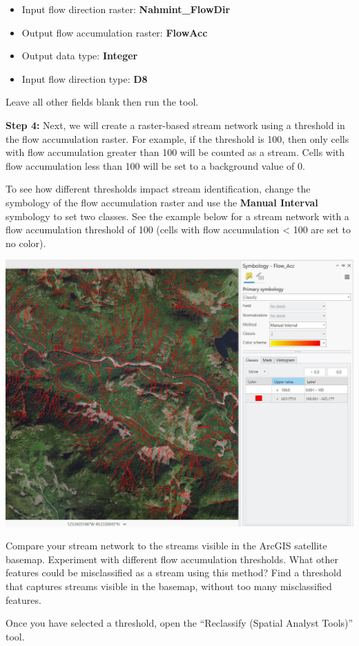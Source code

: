 \documentclass[
]{book}
\providecommand{\tightlist}{%
  \setlength{\itemsep}{0pt}\setlength{\parskip}{0pt}}
\begin{document}
\begin{itemize}
\tightlist
\item
  Input flow direction raster: \textbf{Nahmint\_FlowDir}
\item
  Output flow accumulation raster: \textbf{FlowAcc}
\item
  Output data type: \textbf{Integer}
\item
  Input flow direction type: \textbf{D8}
\end{itemize}

Leave all other fields blank then run the tool.

\textbf{Step 4:} Next, we will create a raster-based stream network using a threshold in the flow accumulation raster. For example, if the threshold is 100, then only cells with flow accumulation greater than 100 will be counted as a stream. Cells with flow accumulation less than 100 will be set to a background value of 0.

To see how different thresholds impact stream identification, change the symbology of the flow accumulation raster and use the \textbf{Manual Interval} symbology to set two classes. See the example below for a stream network with a flow accumulation threshold of 100 (cells with flow accumulation \textless{} 100 are set to no color).

\includegraphics[width=0.75\linewidth]{images/03-streams}

Compare your stream network to the streams visible in the ArcGIS satellite basemap. Experiment with different flow accumulation thresholds. What other features could be misclassified as a stream using this method? Find a threshold that captures streams visible in the basemap, without too many misclassified features.

Once you have selected a threshold, open the ``Reclassify (Spatial Analyst Tools)'' tool.
\end{document}

